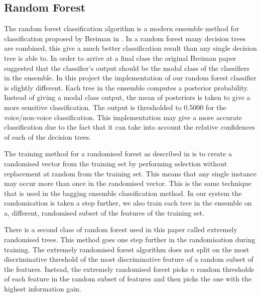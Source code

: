 \documentclass[ %
                    author={Sam Phippen},
                supervisor={Dr. Rafal Bogacz},
                     title={Real time voice activity detectors in noisy personal computing environments},
                  subtitle={},
                    degree={MEng},
                      year={2012} ]{thesis}
\begin{document}

\subsection{Random Forest}
\label{section:random-forest}

The random forest classification algorithm is a modern ensemble method for
classification proposed by Breiman in \cite{breiman}. In a random forest many
decision trees are combined, this give a much better classification result than
any single decision tree is able to. In order to arrive at a final class the
original Breiman paper suggested that the classifier's output should be the
modal class of the classifiers in the ensemble.  In this project the
implementation of our random forest classifier is slightly different. Each tree
in the ensemble computes a posterior probability. Instead of giving a modal
class output, the mean of posteriors is taken to give a more sensitive
classification. The output is thresholded to 0.5000 for the voice/non-voice
classification. This implementation may give a more accurate classification due
to the fact that it can take into account the relative confidences of each of
the decision trees.

The training method for a randomised forest as described in \cite{breiman} is
to create a randomised vector from the training set by performing selection
without replacement at random from the training set. This means that any single
instance may occur more than once in the randomised vector. This is the same
technique that is used in the bagging ensemble classification method. In our
system the randomisation is taken a step further, we also train each tree in
the ensemble on a, different, randomised subset of the features of the training
set.

There is a second class of random forest used in this paper called extremely
randomised trees. This method goes one step further in the randomisation during
training. The extremely randomised forest algorithm does not split on the most
discriminative threshold of the most discriminative feature of a random subset
of the features. Instead, the extremely randomised forest picks $n$ random
thresholds of each feature in the random subset of features and then picks the
one with the highest information gain.
\end{document}
